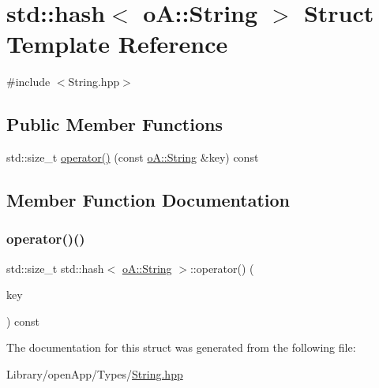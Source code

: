 \hypertarget{structstd_1_1hash_3_01o_a_1_1_string_01_4}{}\section{std\+:\+:hash$<$ oA\+:\+:String $>$ Struct Template Reference}
\label{structstd_1_1hash_3_01o_a_1_1_string_01_4}


{\ttfamily \#include $<$String.\+hpp$>$}

\subsection*{Public Member Functions}
\begin{DoxyCompactItemize}
\item 
std\+::size\+\_\+t \mbox{\hyperlink{structstd_1_1hash_3_01o_a_1_1_string_01_4_a6e23a430fd8bccdc9acf379573e16403}{operator()}} (const \mbox{\hyperlink{classo_a_1_1_string}{o\+A\+::\+String}} \&key) const
\end{DoxyCompactItemize}


\subsection{Member Function Documentation}
\mbox{\label{structstd_1_1hash_3_01o_a_1_1_string_01_4_a6e23a430fd8bccdc9acf379573e16403}} 
\subsubsection{\texorpdfstring{operator()()}{operator()()}}
{\footnotesize\ttfamily std\+::size\+\_\+t std\+::hash$<$ \mbox{\hyperlink{classo_a_1_1_string}{o\+A\+::\+String}} $>$\+::operator() (\begin{DoxyParamCaption}\item[{const \mbox{\hyperlink{classo_a_1_1_string}{o\+A\+::\+String}} \&}]{key }\end{DoxyParamCaption}) const\hspace{0.3cm}{\ttfamily [inline]}}



The documentation for this struct was generated from the following file\+:\begin{DoxyCompactItemize}
\item 
Library/open\+App/\+Types/\mbox{\hyperlink{_string_8hpp}{String.\+hpp}}\end{DoxyCompactItemize}
